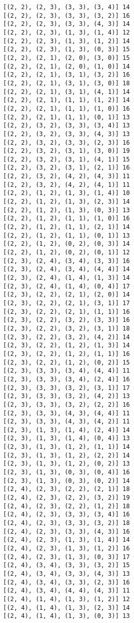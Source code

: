 \documentclass[11pt]{article}
\begin{document}
\begin{Verbatim}[commandchars=\\\{\}]
[(2, 2), (2, 3), (3, 3), (3, 4)] 14
[(2, 2), (2, 3), (3, 3), (3, 2)] 16
[(2, 2), (2, 3), (3, 3), (4, 3)] 14
[(2, 2), (2, 3), (1, 3), (1, 4)] 12
[(2, 2), (2, 3), (1, 3), (1, 2)] 14
[(2, 2), (2, 3), (1, 3), (0, 3)] 15
[(2, 2), (2, 1), (2, 0), (3, 0)] 15
[(2, 2), (2, 1), (2, 0), (1, 0)] 14
[(2, 2), (2, 1), (3, 1), (3, 2)] 16
[(2, 2), (2, 1), (3, 1), (3, 0)] 18
[(2, 2), (2, 1), (3, 1), (4, 1)] 14
[(2, 2), (2, 1), (1, 1), (1, 2)] 14
[(2, 2), (2, 1), (1, 1), (1, 0)] 16
[(2, 2), (2, 1), (1, 1), (0, 1)] 13
[(2, 2), (3, 2), (3, 3), (3, 4)] 13
[(2, 2), (3, 2), (3, 3), (4, 3)] 13
[(2, 2), (3, 2), (3, 3), (2, 3)] 16
[(2, 2), (3, 2), (3, 1), (3, 0)] 19
[(2, 2), (3, 2), (3, 1), (4, 1)] 15
[(2, 2), (3, 2), (3, 1), (2, 1)] 16
[(2, 2), (3, 2), (4, 2), (4, 3)] 11
[(2, 2), (3, 2), (4, 2), (4, 1)] 11
[(2, 2), (1, 2), (1, 3), (1, 4)] 10
[(2, 2), (1, 2), (1, 3), (2, 3)] 14
[(2, 2), (1, 2), (1, 3), (0, 3)] 13
[(2, 2), (1, 2), (1, 1), (1, 0)] 16
[(2, 2), (1, 2), (1, 1), (2, 1)] 14
[(2, 2), (1, 2), (1, 1), (0, 1)] 13
[(2, 2), (1, 2), (0, 2), (0, 3)] 14
[(2, 2), (1, 2), (0, 2), (0, 1)] 12
[(2, 3), (2, 4), (3, 4), (3, 3)] 16
[(2, 3), (2, 4), (3, 4), (4, 4)] 14
[(2, 3), (2, 4), (1, 4), (1, 3)] 14
[(2, 3), (2, 4), (1, 4), (0, 4)] 17
[(2, 3), (2, 2), (2, 1), (2, 0)] 14
[(2, 3), (2, 2), (2, 1), (3, 1)] 17
[(2, 3), (2, 2), (2, 1), (1, 1)] 16
[(2, 3), (2, 2), (3, 2), (3, 3)] 16
[(2, 3), (2, 2), (3, 2), (3, 1)] 18
[(2, 3), (2, 2), (3, 2), (4, 2)] 14
[(2, 3), (2, 2), (1, 2), (1, 3)] 14
[(2, 3), (2, 2), (1, 2), (1, 1)] 16
[(2, 3), (2, 2), (1, 2), (0, 2)] 15
[(2, 3), (3, 3), (3, 4), (4, 4)] 11
[(2, 3), (3, 3), (3, 4), (2, 4)] 16
[(2, 3), (3, 3), (3, 2), (3, 1)] 17
[(2, 3), (3, 3), (3, 2), (4, 2)] 13
[(2, 3), (3, 3), (3, 2), (2, 2)] 16
[(2, 3), (3, 3), (4, 3), (4, 4)] 11
[(2, 3), (3, 3), (4, 3), (4, 2)] 11
[(2, 3), (1, 3), (1, 4), (2, 4)] 14
[(2, 3), (1, 3), (1, 4), (0, 4)] 13
[(2, 3), (1, 3), (1, 2), (1, 1)] 14
[(2, 3), (1, 3), (1, 2), (2, 2)] 14
[(2, 3), (1, 3), (1, 2), (0, 2)] 13
[(2, 3), (1, 3), (0, 3), (0, 4)] 16
[(2, 3), (1, 3), (0, 3), (0, 2)] 14
[(2, 4), (2, 3), (2, 2), (2, 1)] 18
[(2, 4), (2, 3), (2, 2), (3, 2)] 19
[(2, 4), (2, 3), (2, 2), (1, 2)] 18
[(2, 4), (2, 3), (3, 3), (3, 4)] 16
[(2, 4), (2, 3), (3, 3), (3, 2)] 18
[(2, 4), (2, 3), (3, 3), (4, 3)] 16
[(2, 4), (2, 3), (1, 3), (1, 4)] 14
[(2, 4), (2, 3), (1, 3), (1, 2)] 16
[(2, 4), (2, 3), (1, 3), (0, 3)] 17
[(2, 4), (3, 4), (3, 3), (3, 2)] 15
[(2, 4), (3, 4), (3, 3), (4, 3)] 13
[(2, 4), (3, 4), (3, 3), (2, 3)] 16
[(2, 4), (3, 4), (4, 4), (4, 3)] 11
[(2, 4), (1, 4), (1, 3), (1, 2)] 12
[(2, 4), (1, 4), (1, 3), (2, 3)] 14
[(2, 4), (1, 4), (1, 3), (0, 3)] 13

\end{Verbatim}
\end{document}
